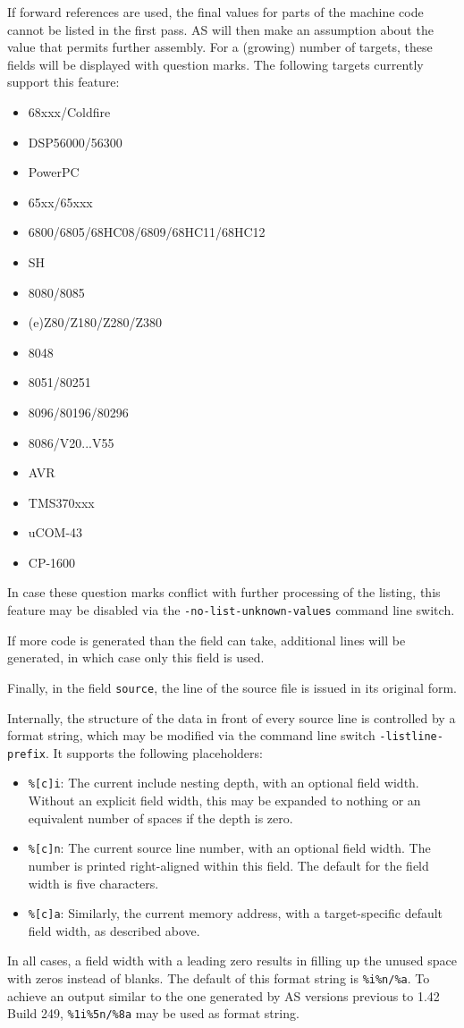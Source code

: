 \documentclass[12pt,twoside]{report}
\newcommand{\tty}[1]{{\tt #1}}
\newcommand{\asname}{{AS}}
\begin{document}
If forward references are used, the final values for parts of the
machine code cannot be listed in the first pass. \asname{} will then
make an assumption about the value that permits further assembly.  For
a (growing) number of targets, these fields will be displayed with
question marks.  The following targets currently support this feature:
\begin{itemize}
\item{68xxx/Coldfire}
\item{DSP56000/56300}
\item{PowerPC}
\item{65xx/65xxx}
\item{6800/6805/68HC08/6809/68HC11/68HC12}
\item{SH}
\item{8080/8085}
\item{(e)Z80/Z180/Z280/Z380}
\item{8048}
\item{8051/80251}
\item{8096/80196/80296}
\item{8086/V20...V55}
\item{AVR}
\item{TMS370xxx}
\item{uCOM-43}
\item{CP-1600}
\end{itemize}
In case these question marks conflict with further processing of the
listing, this feature may be disabled via the \tty{-no-list-unknown-values}
command line switch.

If more code is generated than the field can take, additional lines
will be  generated, in which case only this field is used.

Finally, in the field \tty{source}, the line of the source file is issued in
its original form.

Internally, the structure of the data in front of every source line
is controlled by a format string, which may be modified via the
command line switch {\tt -listline-prefix}.  It supports the
following placeholders:
\begin{itemize}
\item{{\tt \%[c]i}: The current include nesting depth, with an optional
      field width.  Without an explicit field width, this may be
      expanded to nothing or an equivalent number of spaces if
      the depth is zero.}
\item{{\tt \%[c]n}: The current source line number, with an optional
      field width.  The number is printed right-aligned within
      this field. The default for the field width is five characters.}
\item{{\tt \%[c]a}: Similarly, the current memory address, with a
      target-specific default field width, as described above.}
\end{itemize}
In all cases, a field width with a leading zero results in filling up
the unused space with zeros instead of blanks.  The default of this
format string is \verb!%i%n/%a!.  To achieve an output similar to the
one generated by \asname{} versions previous to 1.42 Build 249,
\verb!%1i%5n/%8a! may be used as format string.
\end{document}
